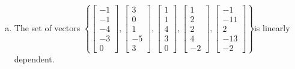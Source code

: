 \begin{exerciseAnswer}
\begin{enumerate}[(a)]
\item  The set of vectors \( \left\{ \left[\begin{array}{c}
-1 \\
-1 \\
-4 \\
-3 \\
0
\end{array}\right] , \left[\begin{array}{c}
3 \\
0 \\
1 \\
-5 \\
3
\end{array}\right] , \left[\begin{array}{c}
1 \\
1 \\
4 \\
3 \\
0
\end{array}\right] , \left[\begin{array}{c}
1 \\
2 \\
2 \\
4 \\
-2
\end{array}\right] , \left[\begin{array}{c}
-1 \\
-11 \\
2 \\
-13 \\
-2
\end{array}\right] \right\} \)is linearly dependent.
\end{enumerate}
    
\end{exerciseAnswer}
    
